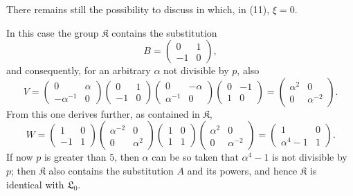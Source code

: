 \documentclass[11pt]{article}
\providecommand{\Lzero}{\mathfrak L_0}
\providecommand{\Kgrp}{\mathfrak K}
\begin{document}
There remains still the possibility to discuss in which, in (11), $\xi=0$.

In this case the group $\Kgrp$ contains the substitution
\[
 B=\begin{pmatrix}0&1\\-1&0\end{pmatrix},
\]
and consequently, for an arbitrary $\alpha$ not divisible by $p$, also
\[
 V=\begin{pmatrix}0&\alpha\\-\alpha^{-1}&0\end{pmatrix}
 \begin{pmatrix}0&1\\-1&0\end{pmatrix}
 \begin{pmatrix}0&-\alpha\\\alpha^{-1}&0\end{pmatrix}
 \begin{pmatrix}0&-1\\1&0\end{pmatrix}
 =\begin{pmatrix}\alpha^2&0\\0&\alpha^{-2}\end{pmatrix}.
\]
From this one derives further, as contained in $\Kgrp$,
\[
 W=\begin{pmatrix}1&0\\-1&1\end{pmatrix}
 \begin{pmatrix}\alpha^{-2}&0\\0&\alpha^2\end{pmatrix}
 \begin{pmatrix}1&0\\1&1\end{pmatrix}
 \begin{pmatrix}\alpha^2&0\\0&\alpha^{-2}\end{pmatrix}
 =\begin{pmatrix}1&0\\ \alpha^4-1&1\end{pmatrix}.
\]
If now $p$ is greater than $5$, then $\alpha$ can be so taken that $\alpha^4-1$ is not divisible by $p$; then $\Kgrp$ also contains the substitution $A$ and its powers, and hence $\Kgrp$ is identical with $\Lzero$.
\end{document}
